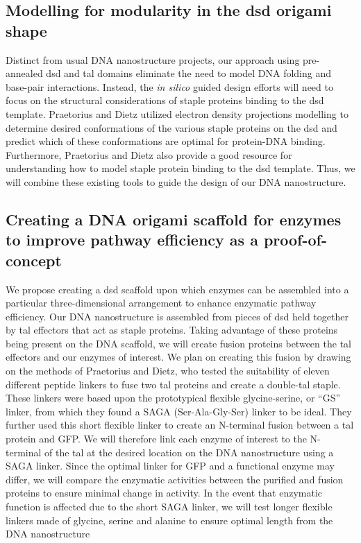 \documentclass[a4paper]{article}
\begin{document}
\subsection*{Modelling for modularity in the \ac{dsd} origami shape}
Distinct from usual DNA nanostructure projects, our approach using pre-annealed \ac{dsd} and \ac{tal} domains eliminate the need to model DNA folding and base-pair interactions.
Instead, the \textit{in silico} guided design efforts will need to focus on the structural considerations of staple proteins binding to the \ac{dsd} template.
Praetorius and Dietz utilized electron density projections modelling to determine desired conformations of the various staple proteins on the \ac{dsd} and predict which of these conformations are optimal for protein-DNA binding\cite{meth2}.
Furthermore, Praetorius and Dietz also provide a good resource for understanding how to model staple protein binding to the \ac{dsd} template\cite{meth2}.
Thus, we will combine these existing tools to guide the design of our DNA nanostructure.
\subsection*{Creating a DNA origami scaffold for enzymes to improve pathway efficiency as a proof-of-concept}
We propose creating a \ac{dsd} scaffold upon which enzymes can be assembled into a particular three-dimensional arrangement to enhance enzymatic pathway efficiency.
Our DNA nanostructure is assembled from pieces of \ac{dsd} held together by \ac{tal} effectors that act as staple proteins.
Taking advantage of these proteins being present on the DNA scaffold, we will create fusion proteins between the \ac{tal} effectors and our enzymes of interest.
We plan on creating this fusion by drawing on the methods of Praetorius and Dietz, who tested the suitability of eleven different peptide linkers to fuse two \ac{tal} proteins and create a double-\ac{tal} staple\cite{meth2}.
These linkers were based upon the prototypical flexible glycine-serine, or “GS” linker, from which they found a SAGA (Ser-Ala-Gly-Ser) linker to be ideal.
They further used this short flexible linker to create an N-terminal fusion between a \ac{tal} protein and GFP.
We will therefore link each enzyme of interest to the N-terminal of the \ac{tal} at the desired location on the DNA nanostructure using a SAGA linker.
Since the optimal linker for GFP and a functional enzyme may differ, we will compare the enzymatic activities between the purified and fusion proteins to ensure minimal change in activity.
In the event that enzymatic function is affected due to the short SAGA linker, we will test longer flexible linkers made of glycine, serine and alanine to ensure optimal length from the DNA nanostructure\cite{meth4}
\end{document}
